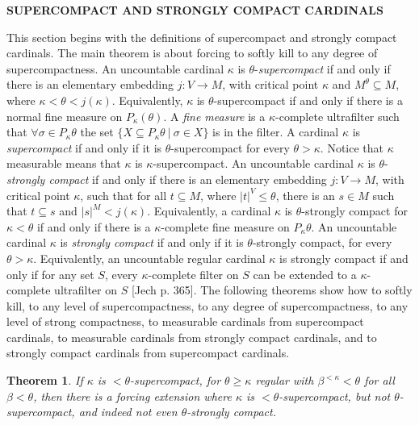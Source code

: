 \documentclass[10pt,leqno]{amsart}
\newtheorem{theorem}{Theorem}[]
\begin{document}
 \vspace{.5 in}

\begin{center}\textbf{SUPERCOMPACT AND STRONGLY COMPACT CARDINALS} \end{center}
\vspace{.2 in}

This section begins with the definitions of supercompact and strongly compact cardinals. The main theorem is about forcing to softly kill to any degree of supercompactness. An uncountable cardinal $\kappa$ is $\theta$-\textit{supercompact} if and only if there is an elementary embedding $j:V \to M$, with critical point $\kappa$ and $M^{\theta} \subseteq M$, where $\kappa < \theta < j(\kappa)$. Equivalently, $\kappa$ is $\theta$-supercompact if and only if there is a normal fine measure on $P_{\kappa}(\theta)$. A \textit{fine measure} is a $\kappa$-complete ultrafilter such that $\forall \sigma \in P_{\kappa} \theta$ the set $\{X \subseteq P_{\kappa} \theta \ | \ \sigma \in X\}$ is in the filter. A cardinal $\kappa$ is \textit{supercompact} if and only if it is $\theta$-supercompact for every $\theta > \kappa$. Notice that $\kappa$ measurable means that $\kappa$ is $\kappa$-supercompact. An uncountable cardinal $\kappa$ is $\theta$-\textit{strongly compact} if and only if there is an elementary embedding $j:V \to M$, with critical point $\kappa$, such that for all $t \subseteq M$, where $|t|^V \le \theta$, there is an $s \in M$ such that $t \subseteq s$ and $|s|^M < j(\kappa)$. Equivalently, a cardinal $\kappa$ is $\theta$-strongly compact for $\kappa < \theta$ if and only if there is a $\kappa$-complete fine measure on $P_{\kappa} \theta$. An uncountable cardinal $\kappa$ is \textit{strongly compact} if and only if it is $\theta$-strongly compact, for every $\theta > \kappa$. Equivalently, an uncountable regular cardinal $\kappa$ is strongly compact if and only if for any set $S$, every $\kappa$-complete filter on $S$ can be extended to a $\kappa$-complete ultrafilter on $S$ [Jech p. 365]. The following theorems show how to softly kill, to any level of supercompactness, to any degree of supercompactness, to any level of strong compactness, to measurable cardinals from supercompact cardinals, to measurable cardinals from strongly compact cardinals, and to strongly compact cardinals from supercompact cardinals.

\begin{theorem} If $\kappa$ is $<\theta$-supercompact, for $\theta \ge \kappa$ regular with $\beta^{<\kappa} < \theta$ for all $\beta < \theta$, then there is a forcing extension where $\kappa$ is $<\theta$-supercompact, but not $\theta$-supercompact, and indeed not even $\theta$-strongly compact.
\end{theorem}
\end{document}
